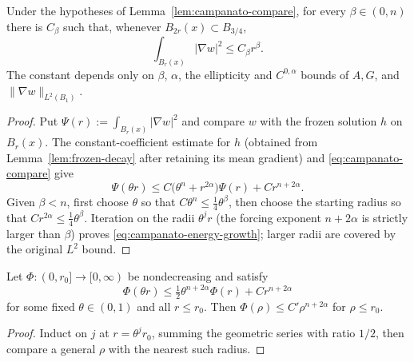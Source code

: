 \begin{lemma}
\label{lem:campanato-energy-growth}
Under the hypotheses of Lemma~\ref{lem:campanato-compare}, for every
$\beta\in(0,n)$ there is $C_\beta$ such that, whenever
$B_{2r}(x)\subset B_{3/4}$,
\begin{equation}\label{eq:campanato-energy-growth}
  \int_{B_r(x)}|\nabla w|^2\le C_\beta r^\beta .
\end{equation}
The constant depends only on $\beta$, $\alpha$, the ellipticity and
$C^{0,\alpha}$ bounds of $A,G$, and $\|\nabla w\|_{L^2(B_1)}$.
\end{lemma}

\begin{proof}
Put $\Psi(r):=\int_{B_r(x)}|\nabla w|^2$ and compare $w$ with the frozen
solution $h$ on $B_r(x)$.  The constant-coefficient estimate for $h$
(obtained from Lemma~\ref{lem:frozen-decay} after retaining its mean
gradient) and \eqref{eq:campanato-compare} give
\[
  \Psi(\theta r)
  \le C\bigl(\theta^n+r^{2\alpha}\bigr)\Psi(r)
       +Cr^{n+2\alpha}.
\]
Given $\beta<n$, first choose $\theta$ so that
$C\theta^n\le\tfrac14\theta^\beta$, then choose the starting radius so that
$Cr^{2\alpha}\le\tfrac14\theta^\beta$.  Iteration on the radii
$\theta^jr$ (the forcing exponent $n+2\alpha$ is strictly larger than
$\beta$) proves \eqref{eq:campanato-energy-growth}; larger radii are covered
by the original $L^2$ bound.
\end{proof}

\begin{lemma}\label{lem:campanato-iteration}
Let $\Phi:(0,r_0]\to[0,\infty)$ be nondecreasing and satisfy
\begin{equation}\label{eq:campanato-recurrence}
  \Phi(\theta r)\le\tfrac12\theta^{n+2\alpha}\Phi(r)+Cr^{n+2\alpha}
\end{equation}
for some fixed $\theta\in(0,1)$ and all $r\le r_0$.  Then
$\Phi(\rho)\le C'\rho^{n+2\alpha}$ for $\rho\le r_0$.
\end{lemma}

\begin{proof}
Induct on $j$ at $r=\theta^jr_0$, summing the geometric series with ratio
$1/2$, then compare a general $\rho$ with the nearest such radius.
\end{proof}

